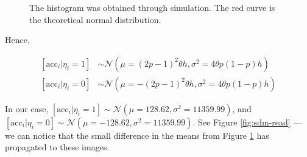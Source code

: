 \documentclass[12pt]{article}
\begin{document}
\begin{figure}[h!]
  \centering

  \caption{The histogram was obtained through simulation. The red curve is the theoretical normal distribution.}
  \label{fig:sdm-read-sums}
\end{figure}

Hence,

\begin{align}
\left[ \text{acc}_i|\eta_i=1 \right] &\sim \mathcal{N}(\mu = (2p-1)^2 \theta h, \sigma^2 = 4 \theta p (1-p) h) \label{eqn:sdm-eta1} \\
\left[ \text{acc}_i|\eta_i=0 \right] &\sim \mathcal{N}(\mu = -(2p-1)^2 \theta h, \sigma^2 = 4 \theta p (1-p) h) \label{eqn:sdm-eta0}
\end{align}

In our case, $\left[ \text{acc}_i|\eta_i=1 \right] \sim \mathcal{N}(\mu = 128.62, \sigma^2 = 11359.99)$, and $\left[ \text{acc}_i|\eta_i=0 \right] \sim \mathcal{N}(\mu = -128.62, \sigma^2 = 11359.99)$. See Figure \ref{fig:sdm-read} --- we can notice that the small difference in the means from Figure \ref{fig:sdm-read-sums} has propagated to these images.
\end{document}
